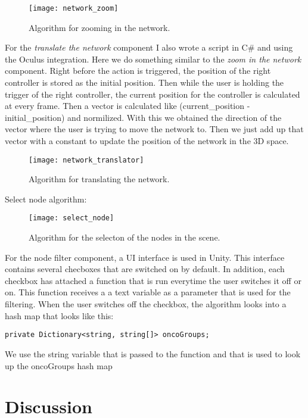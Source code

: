 \begin{figure}[h!]
    \centering%
    \texttt{[image: network\_zoom]}
    \caption{Algorithm for zooming in the network.}
    \label{fig:network_zoom}
\end{figure}%

For the \textit{translate the network} component I also wrote a script in C\# and using the Oculus integration. Here we do something similar to the \textit{zoom in the network} component. Right before the action is triggered, the position of the right controller is stored as the initial position. Then while the user is holding the trigger of the right controller, the current position for the controller is calculated at every frame. Then a vector is calculated like (current\_position - initial\_position) and normilized. With this we obtained the direction of the vector where the user is trying to move the network to. Then we just add up that vector with a constant to update the position of the network in the 3D space.

\begin{figure}[h!]
    \centering%
    \texttt{[image: network\_translator]}
    \caption{Algorithm for translating the network.}
    \label{fig:network_translator}
\end{figure}%

Select node algorithm:
\begin{figure}[h!]
    \centering%
    \texttt{[image: select\_node]}
    \caption{Algorithm for the selecton of the nodes in the scene.}
    \label{fig:select_node}
\end{figure}%

For the node filter component, a UI interface is used in Unity. This interface contains several checboxes that are switched on by default. In addition, each checkbox has attached a function that is run everytime the user switches it off or on. This function receives a a text variable as a parameter that is used for the filtering. When the user switches off the checkbox, the algorithm looks into a hash map that looks like this:

\begin{verbatim}
private Dictionary<string, string[]> oncoGroups;
\end{verbatim}

We use the string variable that is passed to the function and that is used to look up the oncoGroups hash map 

\section{Discussion}

